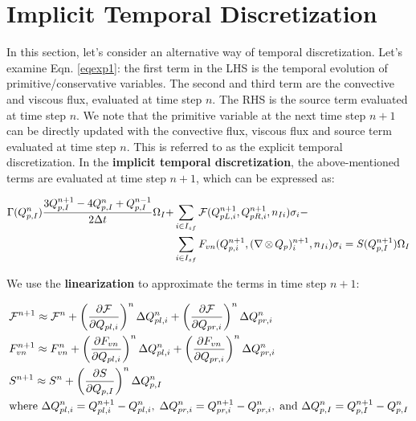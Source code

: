 \documentclass[12pt, letterpaper]{report}
\begin{document}
\clearpage
\section{Implicit Temporal Discretization}

In this section, let's consider an alternative way of temporal discretization. Let's examine Eqn.
\ref{eqexp1}: the first term in the LHS is the temporal evolution of primitive/conservative
variables. The second and third term are the convective and viscous flux, evaluated at time step
$n$. The RHS is the source term evaluated at time step $n$. We note that the primitive variable at
the next time step $n+1$ can be directly updated with the convective flux, viscous flux and source
term evaluated at time step $n$. This is referred to as the explicit temporal discretization. In the
{\bf implicit temporal discretization}, the above-mentioned terms are evaluated at time step $n+1$,
which can be expressed as:

\begin{align}\label{eqimpExpand}
   \begin{split}
      \Gamma(Q_{p,I}^n) \frac{3Q_{p,I}^{n+1} - 4Q_{p,I}^n + Q_{p,I}^{n-1}}{2\Delta t} \Omega_I +
      &\sum_{i \in I_{sf}} \mathcal{F}(Q_{pL,i}^{n+1}, Q_{pR,i}^{n+1}, n_{Ii}) \sigma_i - \\ &\sum_{i \in
      I_{sf}} F_{vn}(Q_{p,i}^{n+1}, (\nabla \mathop{\otimes} Q_p)_i^{n+1}, n_{Ii}) \sigma_i =
      S(Q_{p,I}^{n+1})
      \Omega_I
   \end{split}
\end{align}

We use the {\bf linearization} to approximate the terms in time step $n+1$:

\begin{align}\label{eqlinapp}
   \begin{split}
      &\mathcal{F}^{n+1} \approx \mathcal{F}^n + \left(\frac{\partial \mathcal{F}}{\partial
      Q_{pl,i}}\right)^n \Delta Q_{pl,i}^n + \left(\frac{\partial \mathcal{F}}{\partial Q_{pr,i}}\right)^n \Delta
      Q_{pr,i}^n \\ & F_{vn}^{n+1} \approx F_{vn}^n + \left(\frac{\partial F_{vn}}{\partial
      Q_{pl,i}}\right)^n \Delta Q_{pl,i}^n +
      \left(\frac{\partial F_{vn}}{\partial Q_{pr,i}}\right)^n \Delta Q_{pr,i}^n \\ & S^{n+1}
      \approx S^n + \left(\frac{\partial S}{\partial Q_{p,I}}\right)^n \Delta Q_{p,I}^n
      \\ &\textrm{where } \Delta Q_{pl,i}^n = Q_{pl,i}^{n+1} - Q_{pl,i}^n, \; \Delta Q_{pr,i}^n =
      Q_{pr,i}^{n+1} - Q_{pr,i}^n, \; \textrm{and } \Delta Q_{p,I}^n = Q_{p,I}^{n+1} - Q_{p,I}^n
   \end{split}
\end{align}
\end{document}
